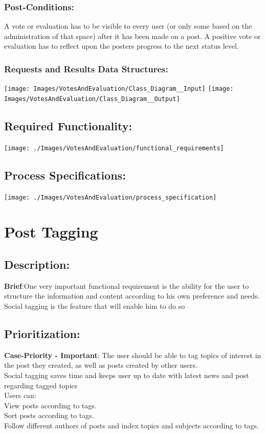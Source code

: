 \documentclass[a4paper,11pt]{article}
\begin{document}
\subsubsection*{Post-Conditions:}
A vote or evaluation has to be visible to every user (or only some based on the administration of that space) after it has been made on a post. A positive vote or evaluation has to reflect upon the posters progress to the next status level.
\subsubsection*{Requests and Results Data Structures:}
\texttt{[image: Images/VotesAndEvaluation/Class\_Diagram\_\_Input]}
\texttt{[image: Images/VotesAndEvaluation/Class\_Diagram\_\_Output]}
\subsection{Required Functionality:} 
\begin{center}
\texttt{[image: ./Images/VotesAndEvaluation/functional\_requirements]}
\end{center}
\subsection{Process Specifications:} 
\begin{center}
\texttt{[image: ./Images/VotesAndEvaluation/process\_specification]}
\end{center}

\section{Post Tagging}
\subsection*{Description:}
\textbf{Brief}:One very important functional requirement is the ability for the user to structure the information and content according to his own preference and needs. Social tagging is the feature that will enable him to do so
\subsection{Prioritization:} 
\textbf{Case-Priority - Important}: The user should be able to tag topics of interest in the post they created, as well
as posts created by other users.
\\Social tagging saves time and keeps user up to date with latest news and post regarding tagged topics
\\Users can: 
\\View posts according to tags.
\\Sort posts according to tags.
\\Follow different authors of posts and index topics and subjects according to tags.
\end{document}
